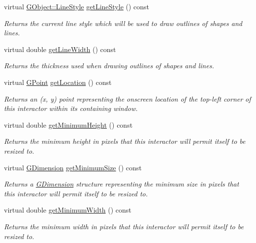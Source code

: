 \begin{DoxyCompactItemize}
virtual \mbox{\hyperlink{classGObject_a86e0f5648542856159bb40775c854aa7}{G\+Object\+::\+Line\+Style}} \mbox{\hyperlink{classGDrawingSurface_aaf1f5ea8281e5e3486662878d26f0a13}{get\+Line\+Style}} () const
\begin{DoxyCompactList}\small\item\em Returns the current line style which will be used to draw outlines of shapes and lines. \end{DoxyCompactList}\item 
virtual double \mbox{\hyperlink{classGDrawingSurface_a85ff266dc3eb63d9f2d8e5a4487fd3c0}{get\+Line\+Width}} () const
\begin{DoxyCompactList}\small\item\em Returns the thickness used when drawing outlines of shapes and lines. \end{DoxyCompactList}\item 
virtual \mbox{\hyperlink{structGPoint}{G\+Point}} \mbox{\hyperlink{classGInteractor_a4f83802015511edeb63b892830812c11}{get\+Location}} () const
\begin{DoxyCompactList}\small\item\em Returns an (x, y) point representing the onscreen location of the top-\/left corner of this interactor within its containing window. \end{DoxyCompactList}\item 
virtual double \mbox{\hyperlink{classGInteractor_aed4b0075fcc434499c3cb3e46896bda3}{get\+Minimum\+Height}} () const
\begin{DoxyCompactList}\small\item\em Returns the minimum height in pixels that this interactor will permit itself to be resized to. \end{DoxyCompactList}\item 
virtual \mbox{\hyperlink{structGDimension}{G\+Dimension}} \mbox{\hyperlink{classGInteractor_a66b5af0b32493b4d597ca0a3df2049ea}{get\+Minimum\+Size}} () const
\begin{DoxyCompactList}\small\item\em Returns a \mbox{\hyperlink{structGDimension}{G\+Dimension}} structure representing the minimum size in pixels that this interactor will permit itself to be resized to. \end{DoxyCompactList}\item 
virtual double \mbox{\hyperlink{classGInteractor_a59e668114fe3d49d2a0f28deb258f7c8}{get\+Minimum\+Width}} () const
\begin{DoxyCompactList}\small\item\em Returns the minimum width in pixels that this interactor will permit itself to be resized to. \end{DoxyCompactList}\item 

\end{DoxyCompactItemize}
